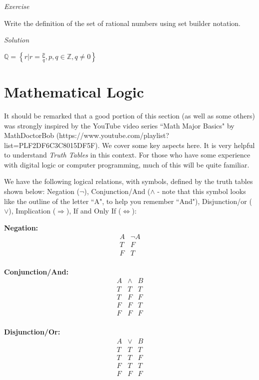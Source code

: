 \textit {Exercise}

Write the definition of the set of rational numbers using set builder notation.

\textit{Solution}

$\mathbb{Q}=\left\{r | r = \frac{p}{q}, p,q \in \mathbb{Z}, q \ne 0 \right\}$

\section{Mathematical Logic}

It should be remarked that a good portion of this section (as well as some others) was strongly inspired by the YouTube video series ``Math Major Basics" by MathDoctorBob (https://www.youtube.com/playlist?list=PLF2DF6C3C8015DF5F).  We cover some key aspects here.  It is very helpful to understand \textit{Truth Tables} in this context.  For those who have some experience with digital logic or computer programming, much of this will be quite familiar.

We have the following logical relations, with symbols, defined by the truth tables shown below:  Negation ($\neg$), Conjunction/And ($\land$ - note that this symbol looks like the outline of the letter ``A", to help you remember ``And"), Disjunction/or ($\lor$), Implication ($\Longrightarrow$), If and Only If ($\Longleftrightarrow$):

\textbf{Negation:}
\begin{displaymath}
\begin{array}{|c|c|}
A & \neg A \\
\hline
T & F \\
F & T \\
\end{array}
\end{displaymath}

\textbf{Conjunction/And:}
\begin{displaymath}
\begin{array}{|c|c|c|}
A & \land & B  \\
\hline
T & T & T  \\
T & F & F  \\
F & F & T  \\
F & F & F  \\
\end{array}
\end{displaymath}

\textbf{Disjunction/Or:}
\begin{displaymath}
\begin{array}{|c|c|c|}
A & \lor & B  \\
\hline
T & T & T  \\
T & T & F  \\
F & T & T  \\
F & F & F  \\
\end{array}
\end{displaymath}

